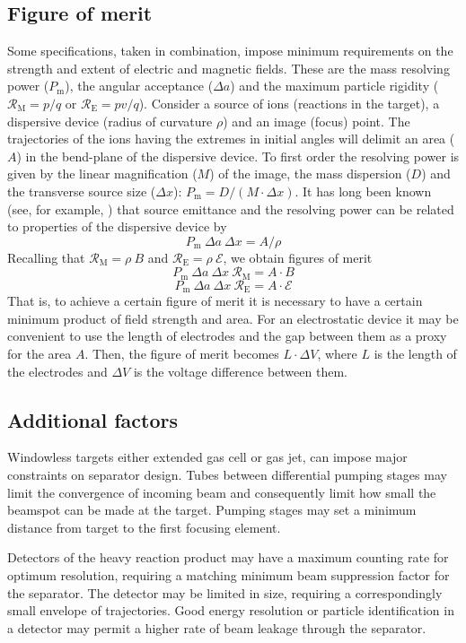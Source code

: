   \subsection{Figure of merit}
  Some specifications, taken in combination, impose minimum requirements on the strength and extent of electric and magnetic fields.   These are the mass resolving power ($P_\mathrm{m}$), the angular acceptance ($\Delta a$) and the maximum particle rigidity 
  ($\mathcal{R}_\mathrm{M}=p/q$ or $\mathcal{R}_\mathrm{E}=pv/q$).    
  Consider a source of ions (reactions in the target), a dispersive device  (radius of curvature $\rho$) and an image (focus) point.   The  trajectories of the ions having the extremes in initial angles will delimit an area ($A$)  in the bend-plane of the dispersive device.     To first order the resolving power is given by the linear magnification ($M$) of the image, the mass dispersion ($D$) and the transverse source size ($\Delta x$): 
  $P_\mathrm{m} = D/(M \cdot \Delta x) $. 
  It has long been known (see, for example, \cite{Wo71}) that source emittance and the resolving power can be related to properties of the dispersive device by
  \[ P_\mathrm{m}\  \Delta a\  \Delta x = A/\rho \]
  Recalling that 
  $\mathcal{R}_\mathrm{M}=\rho \ B$ and $\mathcal{R}_\mathrm{E}=\rho \ \mathcal{E}$,  we obtain  figures of merit 
  \[ P_\mathrm{m}\  \Delta a\  \Delta x \ \mathcal{R}_\mathrm{M} = A \cdot B \]
   \[P_\mathrm{m}\  \Delta a\  \Delta x \ \mathcal{R}_\mathrm{E} = A \cdot \mathcal{E} \]
   That is, to achieve a certain figure of merit it is necessary to have a certain minimum product of field strength and area.  For an electrostatic device it may be convenient to use the length of electrodes and the gap between them as a proxy for the area $A$.  Then, the figure of merit becomes $L\cdot\Delta V$, where $L$ is the length of the electrodes and $\Delta V$ is the voltage difference between them.

\subsection{Additional factors} 
  Windowless targets either extended gas cell or gas jet, can impose major constraints on separator design.  Tubes between differential pumping stages may limit the convergence of incoming beam and consequently limit how small the beamspot  can be made at the target.  Pumping stages may set a minimum distance from target to the first focusing element.

Detectors of the heavy reaction product may have a maximum counting rate for optimum resolution, requiring a matching minimum beam suppression factor for the separator.   The detector may be limited in size, requiring a correspondingly small envelope of trajectories.    Good energy resolution or particle identification in a detector may permit a higher rate of beam leakage through the separator.

